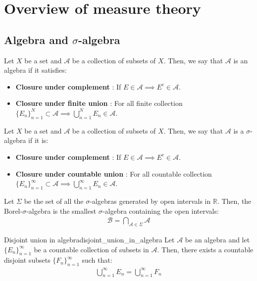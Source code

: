 \section{Overview of measure theory}
\subsection{Algebra and $\sigma$-algebra}
\begin{definition}[Algebra]
    Let $X$ be a set and $\mathcal{A}$ be a collection of subsets of $X$. Then, we say that $\mathcal{A}$ is an algebra if it satisfies:
    \begin{itemize}
        \item \textbf{Closure under complement} : If $E \in \mathcal{A} \implies E^c \in \mathcal{A}$.
        \item \textbf{Closure under finite union} : For all finite collection $\{E_n\}_{n=1}^N\subset \mathcal{A} \implies \bigcup_{n=1}^N E_n \in \mathcal{A}$.
    \end{itemize}
\end{definition}

\begin{definition}
    Let $X$ be a set and $\mathcal{A}$ be a collection of subsets of $X$. Then, we say that $\mathcal{A}$ is a $\sigma$-algebra if it is:
    \begin{itemize}
        \item \textbf{Closure under complement} : If $E \in \mathcal{A} \implies E^c \in \mathcal{A}$.
        \item \textbf{Closure under countable union} : For all countable collection $\{E_n\}_{n=1}^\infty\subset \mathcal{A} \implies \bigcup_{n=1}^\infty E_n \in \mathcal{A}$.
    \end{itemize}
\end{definition}

\begin{definition}
    Let $\Sigma$ be the set of all the $\sigma$-algebras generated by open intervals in $\mathbb{R}$. Then, the Borel-$\sigma$-algebra is the smallest $\sigma$-algebra containing the open intervals:
    \begin{align*}
        \mathcal{B} = \bigcap_{\mathcal{A}\in\Sigma} \mathcal{A}
    \end{align*}
\end{definition}

\begin{proposition}{Disjoint union in algebra}{disjoint_union_in_algebra}
    Let $\mathcal{A}$ be an algebra and let $\{E_n\}_{n=1}^\infty$ be a countable collection of subsets in $\mathcal{A}$. Then, there exists a countable disjoint subsets $\{F_n\}_{n=1}^\infty$ such that:
    \begin{align*}
        \bigcup_{n=1}^\infty E_n = \bigcup_{n=1}^\infty F_n
    \end{align*}
\end{proposition}

